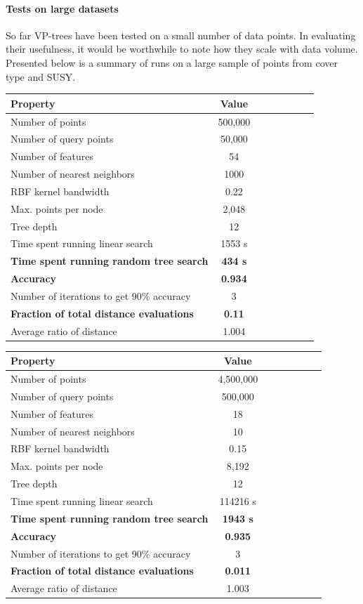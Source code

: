 \documentclass[11pt]{article}
\begin{document}
\paragraph{Tests on large datasets} So far VP-trees have been tested on a small number of data points. In evaluating their usefulness, it would be worthwhile to note how they scale with data volume. Presented below is a summary of runs on a large sample of points from cover type and SUSY.
\begin{center}
\begin{tabular}{l*{6}{c}r} Property & Value \\ 
\hline 
Number of points & 500,000 \\ 
Number of query points & 50,000 \\ 
Number of features & 54 \\ 
Number of nearest neighbors & 1000 \\ 
RBF kernel bandwidth & 0.22 \\
Max. points per node & 2,048 \\
Tree depth & 12 \\
Time spent running linear search & 1553 s \\
\textbf{Time spent running random tree search} & \textbf{434 s} \\
\textbf{Accuracy} & \textbf{0.934} \\
Number of iterations to get 90\% accuracy & 3 \\
\textbf{Fraction of total distance evaluations} & \textbf{0.11 }\\
Average ratio of distance & 1.004 \\
\end{tabular}
 \label{tab:results}
\end{center}
\begin{center}
\begin{tabular}{l*{6}{c}r} Property & Value \\ 
\hline 
Number of points & 4,500,000 \\ 
Number of query points & 500,000 \\ 
Number of features & 18 \\ 
Number of nearest neighbors & 10 \\ 
RBF kernel bandwidth & 0.15 \\
Max. points per node & 8,192 \\
Tree depth & 12 \\
Time spent running linear search & 114216 s \\
\textbf{Time spent running random tree search} & \textbf{1943 s} \\
\textbf{Accuracy} & \textbf{0.935} \\
Number of iterations to get 90\% accuracy & 3 \\
\textbf{Fraction of total distance evaluations} & \textbf{0.011 }\\
Average ratio of distance & 1.003 \\
\end{tabular}
 \label{tab:resultssusy}
\end{center}
\end{document}
